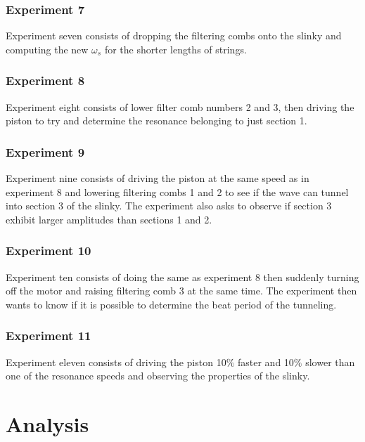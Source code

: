 \documentclass{article}
\begin{document}
\subsubsection*{Experiment 7}
Experiment seven consists of dropping the filtering combs onto the slinky and
computing the new $\omega_s$ for the shorter lengths of strings.

\subsubsection*{Experiment 8}
Experiment eight consists of lower filter comb numbers 2 and 3, then driving the
piston to try and determine the resonance belonging to just section 1.

\subsubsection*{Experiment 9}
Experiment nine consists of driving the piston at the same speed as in
experiment 8 and lowering filtering combs 1 and 2 to see if the wave can tunnel
into section 3 of the slinky. The experiment also asks to observe if section 3
exhibit larger amplitudes than sections 1 and 2.

\subsubsection*{Experiment 10}
Experiment ten consists of doing the same as experiment 8 then suddenly turning
off the motor and raising filtering comb 3 at the same time. The experiment then
wants to know if it is possible to determine the beat period of the tunneling.

\subsubsection*{Experiment 11}
Experiment eleven consists of driving the piston 10$\%$ faster and 10$\%$ slower
than one of the resonance speeds and observing the properties of the slinky.

\section{Analysis}
\end{document}

